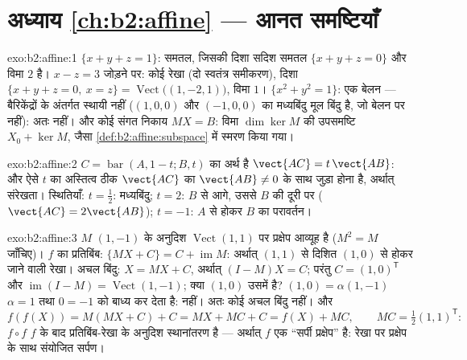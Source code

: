 \section*{अध्याय \ref{ch:b2:affine} --- आनत समष्टियाँ}

\begin{solution}{exo:b2:affine:1}
$\{x + y + z = 1\}$:  समतल, जिसकी दिशा सदिश समतल $\{x
+ y + z = 0\}$ और विमा $2$ है। $x - z = 3$ जोड़ने पर: कोई
 रेखा (दो स्वतंत्र समीकरण), दिशा $\{x + y + z = 0,\ x = z\}
= \operatorname{Vect}\bigl((1, -2, 1)\bigr)$, विमा $1$। $\{x^2
+ y^2 = 1\}$: एक बेलन ---
बैरिकेंद्रों के अंतर्गत स्थायी नहीं ($(1,0,0)$ और $(-1,0,0)$ का मध्यबिंदु मूल बिंदु है,
जो बेलन पर नहीं): अतः  नहीं। और कोई संगत निकाय $MX = B$: विमा $\dim\ker M$ की 
उपसमष्टि $X_0 + \ker M$, जैसा \cref{def:b2:affine:subspace} में स्मरण किया गया।
\end{solution}

\begin{solution}{exo:b2:affine:2}
$C = \operatorname{bar}(A, 1-t; B, t)$ का अर्थ है $\vect{AC} =
t\,\vect{AB}$: और ऐसे $t$ का अस्तित्व ठीक $\vect{AC}$ का $\vect{AB} \neq 0$ के साथ जुड़ा
होना है, अर्थात् संरेखता। स्थितियाँ: $t
= \frac12$: मध्यबिंदु; $t = 2$: $B$ से आगे, उससे
$B$ की दूरी पर ($\vect{AC} = 2\vect{AB}$); $t = -1$: $A$ से होकर $B$ का परावर्तन।
\end{solution}

\begin{solution}{exo:b2:affine:3}
$M$ $(1,-1)$ के अनुदिश $\operatorname{Vect}(1,1)$ पर प्रक्षेप आव्यूह है ($M^2 = M$ जाँचिए)। $f$ का प्रतिबिंब:
$\{MX + C\} = C +
\operatorname{im} M$: अर्थात् $(1,1)$ से दिशित $(1,0)$ से होकर जाने वाली  रेखा। अचल बिंदु: $X = MX + C$,
अर्थात् $(I - M)X = C$; परंतु $C =
(1, 0)^{\mathsf T}$ और $\operatorname{im}(I - M) =
\operatorname{Vect}(1,-1)$; क्या $(1,0)$ उसमें है? $(1, 0) =
\alpha(1,-1)$ $\alpha = 1$ तथा $0 = -1$ को
बाध्य कर देता है: नहीं। अतः कोई अचल बिंदु नहीं। और
\[
f(f(X)) = M(MX + C) + C = MX + MC + C = f(X) + MC,
\qquad MC = \tfrac12(1,1)^{\mathsf T} :
\]
$f\circ f$ $f$ के बाद प्रतिबिंब-रेखा के अनुदिश स्थानांतरण है --- अर्थात् $f$
एक ``सर्पी प्रक्षेप'' है: रेखा पर प्रक्षेप के साथ संयोजित सर्पण।
\end{solution}

